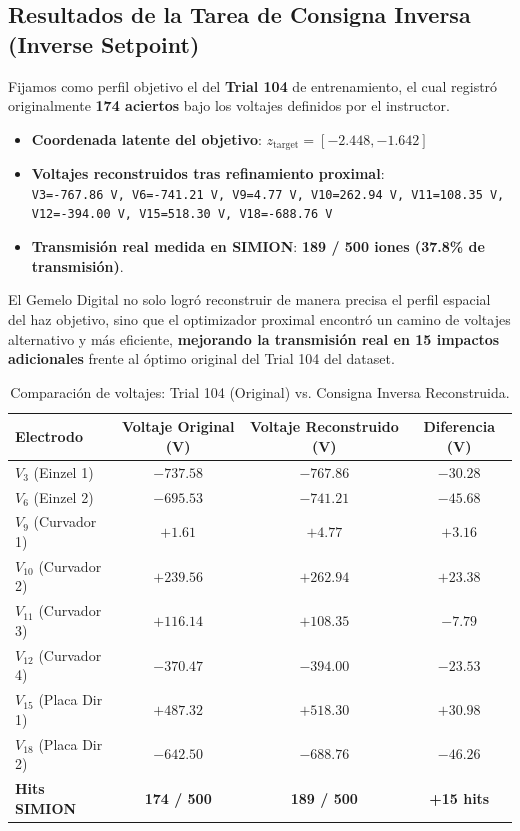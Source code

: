 \documentclass[12pt,letterpaper]{article}
\begin{document}
\subsection{Resultados de la Tarea de Consigna Inversa (Inverse Setpoint)}
Fijamos como perfil objetivo el del \textbf{Trial 104} de entrenamiento, el cual registró originalmente \textbf{174 aciertos} bajo los voltajes definidos por el instructor.
\begin{itemize}
    \item \textbf{Coordenada latente del objetivo}: $z_{\text{target}} = [-2.448, -1.642]$
    \item \textbf{Voltajes reconstruidos tras refinamiento proximal}: \\
    \texttt{V3=-767.86 V, V6=-741.21 V, V9=4.77 V, V10=262.94 V, V11=108.35 V, V12=-394.00 V, V15=518.30 V, V18=-688.76 V}
    \item \textbf{Transmisión real medida en SIMION}: \textbf{189 / 500 iones (37.8\% de transmisión)}.
\end{itemize}
El Gemelo Digital no solo logró reconstruir de manera precisa el perfil espacial del haz objetivo, sino que el optimizador proximal encontró un camino de voltajes alternativo y más eficiente, \textbf{mejorando la transmisión real en 15 impactos adicionales} frente al óptimo original del Trial 104 del dataset.

\begin{table}[h]
    \centering
    \caption{Comparación de voltajes: Trial 104 (Original) vs. Consigna Inversa Reconstruida.}
    \begin{tabular}{lccc}
        \toprule
        \textbf{Electrodo} & \textbf{Voltaje Original (V)} & \textbf{Voltaje Reconstruido (V)} & \textbf{Diferencia (V)} \\
        \midrule
        $V_3$ (Einzel 1)   & $-737.58$ & $-767.86$ & $-30.28$ \\
        $V_6$ (Einzel 2)   & $-695.53$ & $-741.21$ & $-45.68$ \\
        $V_9$ (Curvador 1)  & $+1.61$   & $+4.77$   & $+3.16$  \\
        $V_{10}$ (Curvador 2) & $+239.56$ & $+262.94$ & $+23.38$ \\
        $V_{11}$ (Curvador 3) & $+116.14$ & $+108.35$ & $-7.79$  \\
        $V_{12}$ (Curvador 4) & $-370.47$ & $-394.00$ & $-23.53$ \\
        $V_{15}$ (Placa Dir 1) & $+487.32$ & $+518.30$ & $+30.98$ \\
        $V_{18}$ (Placa Dir 2) & $-642.50$ & $-688.76$ & $-46.26$ \\
        \midrule
        \textbf{Hits SIMION} & \textbf{174 / 500} & \textbf{189 / 500} & \textbf{+15 hits} \\
        \bottomrule
    \end{tabular}
    \label{tab:comp_voltages}
\end{table}
\end{document}
